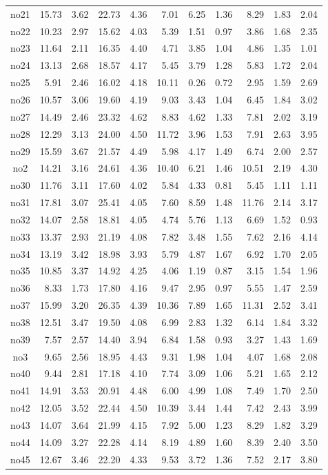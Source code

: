 {\begin{longtable}{@{}cr@{\hspace{1em}}r@{\hspace{1em}}r@{\hspace{1em}}r@{\hspace{1em}}r@{\hspace{2em}}r@{\hspace{1em}}r@{\hspace{1em}}r@{\hspace{1em}}r@{\hspace{1em}}r@{}}
no21&15.73&3.62&22.73&4.36&7.01&6.25&1.36&8.29&1.83&2.04\\
no22&10.23&2.97&15.62&4.03&5.39&1.51&0.97&3.86&1.68&2.35\\
no23&11.64&2.11&16.35&4.40&4.71&3.85&1.04&4.86&1.35&1.01\\
no24&13.13&2.68&18.57&4.17&5.45&3.79&1.28&5.83&1.72&2.04\\
no25&5.91&2.46&16.02&4.18&10.11&0.26&0.72&2.95&1.59&2.69\\
no26&10.57&3.06&19.60&4.19&9.03&3.43&1.04&6.45&1.84&3.02\\
no27&14.49&2.46&23.32&4.62&8.83&4.62&1.33&7.81&2.02&3.19\\
no28&12.29&3.13&24.00&4.50&11.72&3.96&1.53&7.91&2.63&3.95\\
no29&15.59&3.67&21.57&4.49&5.98&4.17&1.49&6.74&2.00&2.57\\
no2&14.21&3.16&24.61&4.36&10.40&6.21&1.46&10.51&2.19&4.30\\
no30&11.76&3.11&17.60&4.02&5.84&4.33&0.81&5.45&1.11&1.11\\
no31&17.81&3.07&25.41&4.05&7.60&8.59&1.48&11.76&2.14&3.17\\
no32&14.07&2.58&18.81&4.05&4.74&5.76&1.13&6.69&1.52&0.93\\
no33&13.37&2.93&21.19&4.08&7.82&3.48&1.55&7.62&2.16&4.14\\
no34&13.19&3.42&18.98&3.93&5.79&4.87&1.67&6.92&1.70&2.05\\
no35&10.85&3.37&14.92&4.25&4.06&1.19&0.87&3.15&1.54&1.96\\
no36&8.33&1.73&17.80&4.16&9.47&2.95&0.97&5.55&1.47&2.59\\
no37&15.99&3.20&26.35&4.39&10.36&7.89&1.65&11.31&2.52&3.41\\
no38&12.51&3.47&19.50&4.08&6.99&2.83&1.32&6.14&1.84&3.32\\
no39&7.57&2.57&14.40&3.94&6.84&1.58&0.93&3.27&1.43&1.69\\
no3&9.65&2.56&18.95&4.43&9.31&1.98&1.04&4.07&1.68&2.08\\
no40&9.44&2.81&17.18&4.10&7.74&3.09&1.06&5.21&1.65&2.12\\
no41&14.91&3.53&20.91&4.48&6.00&4.99&1.08&7.49&1.70&2.50\\
no42&12.05&3.52&22.44&4.50&10.39&3.44&1.44&7.42&2.43&3.99\\
no43&14.07&3.64&21.99&4.15&7.92&5.00&1.23&8.29&1.82&3.29\\
no44&14.09&3.27&22.28&4.14&8.19&4.89&1.60&8.39&2.40&3.50\\
no45&12.67&3.46&22.20&4.33&9.53&3.72&1.36&7.52&2.17&3.80\\

\end{longtable}}
